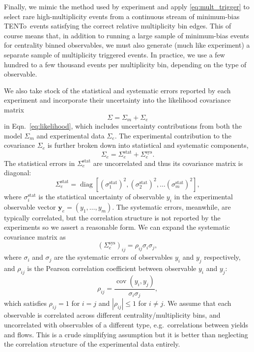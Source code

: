 \documentclass[aps,prc,reprint,amsmath,nofootinbib]{revtex4-1}
\newcommand{\trento}{T\raisebox{-0.5ex}{R}ENTo}
\newcommand{\y}{\mathbf y}
\DeclareMathOperator{\diag}{diag}
\DeclareMathOperator{\cov}{cov}
\begin{document}
Finally, we mimic the method used by experiment and apply \eqref{eq:mult_trigger} to select rare high-multiplicity events from a continuous stream of minimum-bias \trento\ events satisfying the correct relative multiplicity bin edges.
This of course means that, in addition to running a large sample of minimum-bias events for centrality binned observables, we must also generate (much like experiment) a separate sample of multiplicity triggered events.
In practice, we use a few hundred to a few thousand events per multiplicity bin, depending on the type of observable.

We also take stock of the statistical and systematic errors reported by each experiment and incorporate their uncertainty into the likelihood covariance matrix
\begin{equation}
  \Sigma = \Sigma_m + \Sigma_e
\end{equation}
in Eqn.~\eqref{eq:likelihood}, which includes uncertainty contributions from both the model $\Sigma_m$ and experimental data $\Sigma_e$.
The experimental contribution to the covariance $\Sigma_e$ is further broken down into statistical and systematic components,
\begin{equation}
  \Sigma_e = \Sigma_e^\text{stat} + \Sigma_e^\text{sys}.
\end{equation}
The statistical errors in $\Sigma_e^\text{stat}$ are uncorrelated and thus its covariance matrix is diagonal:
\begin{equation}
  \Sigma_e^\text{stat} = \diag[(\sigma^\text{stat}_1)^2, (\sigma^\text{stat}_2)^2, \dots (\sigma^\text{stat}_m)^2 ],
\end{equation}
where $\sigma^\text{stat}_i$ is the statistical uncertainty of observable $y_i$ in the experimental observable vector $\y_e = (y_1, \dots, y_m)$.
The systematic errors, meanwhile, are typically correlated, but the correlation structure is not reported by the experiments so we assert a reasonable form.
We can expand the systematic covariance matrix as
\begin{equation}
  (\Sigma_e^\text{sys})_{ij} =  \rho_{ij} \sigma_i \sigma_j,
\end{equation}
where $\sigma_i$ and $\sigma_j$ are the systematic errors of observables $y_i$ and $y_j$ respectively, and $\rho_{ij}$ is the Pearson correlation coefficient between observable $y_i$ and $y_j$:
\begin{equation}
  \rho_{ij} = \frac{\cov(y_i, y_j)}{\sigma_i \sigma_j},
\end{equation}
which satisfies $\rho_{ij}=1$ for $i=j$ and $|\rho_{ij}| \le 1$ for $i \ne j$.
We assume that each observable is correlated across different centrality/multiplicity bins, and uncorrelated with observables of a different type, e.g.\ correlations between yields and flows.
This is a crude simplifying assumption but it is better than neglecting the correlation structure of the experimental data entirely.
\end{document}
